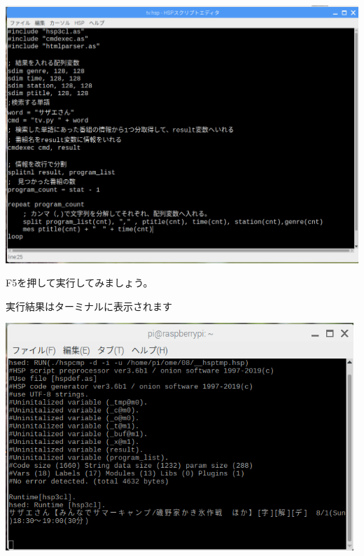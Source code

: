 \documentclass[a4paper,12pt,dvipdfmx]{jarticle}
\begin{document}
\begin{center}
\includegraphics[width=15.284cm]{textbook-img043.png}

\end{center}


\bigskip


\bigskip

F5を押して実行してみましょう。

実行結果はターミナルに表示されます



\begin{center}
\includegraphics[width=13.157cm]{textbook-img044.png}

\end{center}

\bigskip
\end{document}
